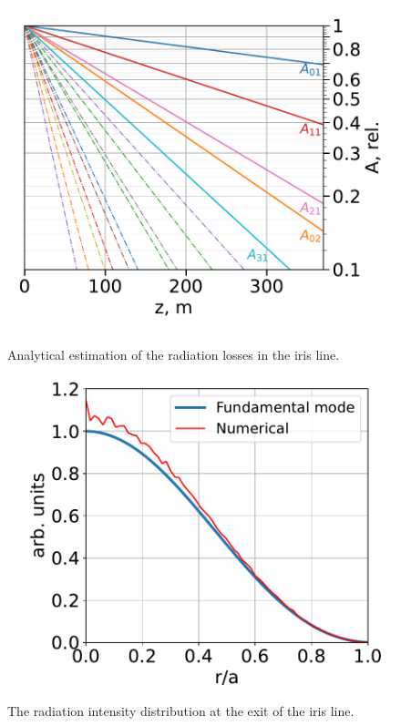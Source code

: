     \begin{figure}[h!]
        \centering
        \begin{minipage}{0.45\textwidth}
            \centering
            \includegraphics[width=\textwidth]{content/images/transport/prop_losses_Nf_101_z_370.pdf} %
            \caption{Analytical estimation of the radiation losses in the iris line.}
            \label{Fig:mode_losses}
        \end{minipage}\hfill
        \begin{minipage}{0.45\textwidth}
            \centering
            \includegraphics[width=\textwidth]{content/images/transport/mode_vs_prop.pdf} %
            \caption{The radiation intensity distribution at the exit of the iris line.}
            \label{Fig:comparison_spatial_dist}
        \end{minipage}
    \end{figure}
    
